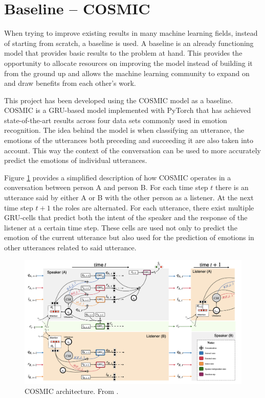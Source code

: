\documentclass[nofilelist]{cslthse-msc}
\begin{document}
\section{Baseline -- COSMIC}
When trying to improve existing results in many machine learning fields, instead of starting from scratch, a baseline is used. A baseline is an already functioning model that provides basic results to the problem at hand. This provides the opportunity to allocate resources on improving the model instead of building it from the ground up and allows the machine learning community to expand on and draw benefits from each other's work. 

This project has been developed using the COSMIC model \citep{ghosal2020cosmic} as a baseline. COSMIC is a GRU-based model implemented with PyTorch that has achieved state-of-the-art results across four data sets commonly used in emotion recognition. The idea behind the model is when classifying an utterance, the emotions of the utterances both preceding and succeeding it are also taken into account. This way the context of the conversation can be used to more accurately predict the emotions of individual utterances. 




Figure \ref{fig:COSMIC_arch} provides a simplified description of how COSMIC operates in a conversation between person A and person B. For each time step $t$ there is an utterance said by either A or B with the other person as a listener. At the next time step $t+1$ the roles are alternated. For each utterance, there exist multiple GRU-cells that predict both the intent of the speaker and the response of the listener at a certain time step. These cells are used not only to predict the emotion of the current utterance but also used for the prediction of emotions in other utterances related to said utterance. 




\begin{figure}[!ht]
    \centering
    \includegraphics[scale=0.3]{msccls/explanatory_images/COSMIC_arch.png}
    \caption{COSMIC architecture. From \citet{ghosal2020cosmic}.}
    \label{fig:COSMIC_arch}
\end{figure}
\end{document}
